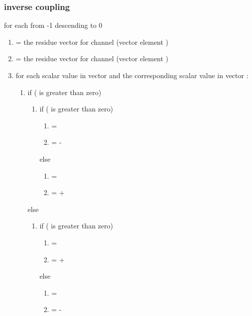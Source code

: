 \subsubsection{inverse coupling}

for each \varname{[i]} from -1 descending to 0

\begin{enumerate}
 \item {} = the residue vector for channel
(vector  element \varname{[i]})
 \item {} = the residue vector for channel (vector
 element \varname{[i]})
 \item for each scalar value \varname{[M]} in vector  and the corresponding scalar value \varname{[A]} in vector :
  \begin{enumerate}
   \item if (\varname{[M]} is greater than zero)
    \begin{enumerate}
     \item if (\varname{[A]} is greater than zero)
      \begin{enumerate}
       \item \varname{[new_M]} = \varname{[M]}
       \item \varname{[new_A]} = \varname{[M]}-\varname{[A]}
      \end{enumerate}
     else
      \begin{enumerate}
       \item \varname{[new_A]} = \varname{[M]}
       \item \varname{[new_M]} = \varname{[M]}+\varname{[A]}
      \end{enumerate}

    \end{enumerate}
   else
    \begin{enumerate}
     \item if (\varname{[A]} is greater than zero)
      \begin{enumerate}
       \item \varname{[new_M]} = \varname{[M]}
       \item \varname{[new_A]} = \varname{[M]}+\varname{[A]}
      \end{enumerate}
     else
      \begin{enumerate}
       \item \varname{[new_A]} = \varname{[M]}
       \item \varname{[new_M]} = \varname{[M]}-\varname{[A]}
      \end{enumerate}


\end{enumerate}
\end{enumerate}
\end{enumerate}
